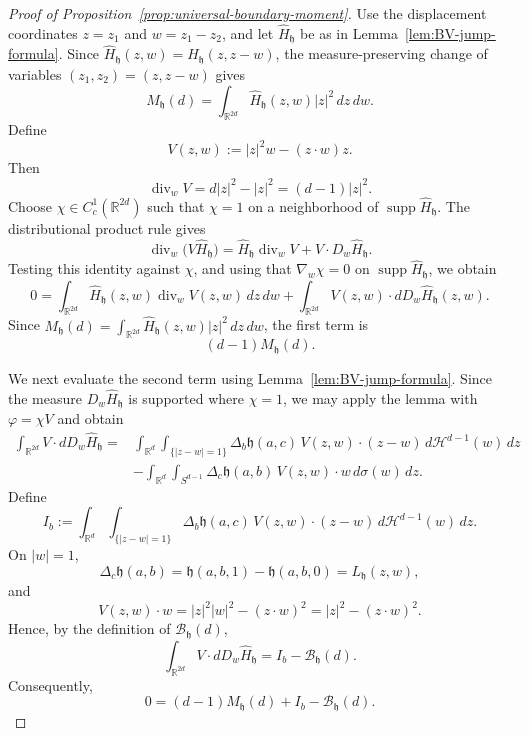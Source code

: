 \documentclass[11pt]{article}
\theoremstyle{remark}
\numberwithin{equation}{section}
\begin{document}
\begin{proof}[Proof of Proposition~\ref{prop:universal-boundary-moment}]
Use the displacement coordinates $z=z_1$ and $w=z_1-z_2$, and let $\widehat H_{\mathfrak h}$ be as in Lemma~\ref{lem:BV-jump-formula}. Since 
$\widehat H_{\mathfrak h}(z,w) = H_{\mathfrak h}(z,z-w)$, 
the measure-preserving change of variables 
$(z_1,z_2)=(z,z-w)$ gives 
\[ M_{\mathfrak h}(d) = \int_{\mathbb R^{2d}} \widehat H_{\mathfrak h}(z,w)|z|^2\,dz\,dw. \]
Define 
\[ V(z,w) := |z|^2w-(z\cdot w)z. \]
Then
\[
\operatorname{div}_w V
=
d|z|^2-|z|^2
=
(d-1)|z|^2.
\]
Choose $\chi\in C_c^1(\mathbb R^{2d})$ such that $\chi=1$ on a
neighborhood of $\operatorname{supp}\widehat H_{\mathfrak h}$.  The
distributional product rule gives
\[
\operatorname{div}_w
\bigl(V\widehat H_{\mathfrak h}\bigr)
=
\widehat H_{\mathfrak h}\operatorname{div}_w V
+
V\cdot D_w\widehat H_{\mathfrak h}.
\]
Testing this identity against $\chi$, and using that
$\nabla_w\chi=0$ on $\operatorname{supp}\widehat H_{\mathfrak h}$, we obtain
\[
0
=
\int_{\mathbb R^{2d}}
\widehat H_{\mathfrak h}(z,w)
\operatorname{div}_w V(z,w)\,dz\,dw
+
\int_{\mathbb R^{2d}}
V(z,w)\cdot dD_w\widehat H_{\mathfrak h}(z,w).
\]
Since 
$M_{\mathfrak h}(d)
=
\int_{\mathbb R^{2d}}
\widehat H_{\mathfrak h}(z,w)|z|^2\,dz\,dw$,
the first term is
\[
(d-1)M_{\mathfrak h}(d).
\]

We next evaluate the second term using
Lemma~\ref{lem:BV-jump-formula}.  Since the measure
$D_w\widehat H_{\mathfrak h}$ is supported where $\chi=1$, we may apply
the lemma with $\varphi=\chi V$ and obtain
\begin{align*}
\int_{\mathbb R^{2d}}
V\cdot dD_w\widehat H_{\mathfrak h}
={}&
\int_{\mathbb R^d}\int_{\{|z-w|=1\}}
\Delta_b\mathfrak h(a,c)\,
V(z,w)\cdot(z-w)
\,d\mathcal H^{d-1}(w)\,dz\\
&-
\int_{\mathbb R^d}\int_{S^{d-1}}
\Delta_c\mathfrak h(a,b)\,
V(z,w)\cdot w
\,d\sigma(w)\,dz.
\end{align*}
Define
\[
I_b
:=
\int_{\mathbb R^d}\int_{\{|z-w|=1\}}
\Delta_b\mathfrak h(a,c)\,
V(z,w)\cdot(z-w)
\,d\mathcal H^{d-1}(w)\,dz.
\]
On $|w|=1$,
\[
\Delta_c\mathfrak h(a,b)
=
\mathfrak h(a,b,1)-\mathfrak h(a,b,0)
=
L_{\mathfrak h}(z,w),
\]
and
\[
V(z,w)\cdot w
=
|z|^2|w|^2-(z\cdot w)^2
=
|z|^2-(z\cdot w)^2.
\]
Hence, by the definition of $\mathcal B_{\mathfrak h}(d)$,
\[
\int_{\mathbb R^{2d}}
V\cdot dD_w\widehat H_{\mathfrak h}
=
I_b-\mathcal B_{\mathfrak h}(d).
\]
Consequently,
\begin{equation}
0
=
(d-1)M_{\mathfrak h}(d)
+
I_b
-
\mathcal B_{\mathfrak h}(d).
\label{eq:BV-divergence-ledger}
\end{equation}


\end{proof}
\end{document}

